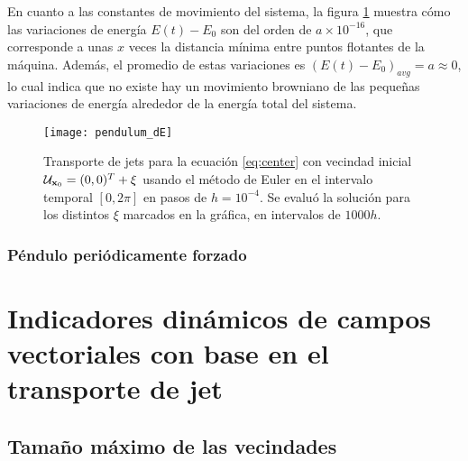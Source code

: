 En cuanto a las constantes de movimiento del sistema, la figura \ref{fig:pendulum_dE} muestra cómo las variaciones de energía $E(t) - E_0$  son del orden de $a\times10^{-16}$, que corresponde a unas $x$ veces la distancia mínima entre puntos flotantes de la máquina. Además, el promedio de estas variaciones es $(E(t)-E_0)_{avg} = a \approx 0$, lo cual indica que no existe hay un movimiento browniano de las pequeñas variaciones de energía alrededor de la energía total del sistema. %

\begin{figure}[h!]
 \centering
 \texttt{[image: pendulum\_dE]}
 \caption{Transporte de jets para la ecuación \ref{eq:center} con vecindad inicial $\mathcal{U}_{\mathbf{x}_0} = (0,0)^T + \xi$ usando el método de Euler en el intervalo temporal $[0,2\pi]$ en pasos de $h=10^{-4}$. Se evaluó la solución para los distintos $\xi$ marcados en la gráfica, en intervalos de $1000h$.}
 \label{fig:pendulum_dE}
\end{figure}

\subsubsection{Péndulo periódicamente forzado}


\section{Indicadores dinámicos de campos vectoriales con base en el transporte de jet}
\label{sec:ind-dinam}


\subsection{Tamaño máximo de las vecindades}
